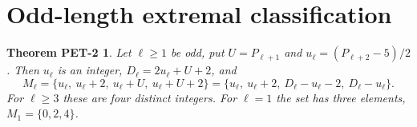 \documentclass[11pt]{amsart}
\theoremstyle{definition}
\theoremstyle{remark}
\theoremstyle{plain}
\newtheorem*{thmPETtwo}{Theorem PET-2}
\numberwithin{equation}{section}
\begin{document}
\section{Odd-length extremal classification}\label{sec:pet2}

\begin{thmPETtwo}\label{thm:pet2}
Let $\ell\ge1$ be odd, put $U=P_{\ell+1}$ and $u_\ell=(P_{\ell+2}-5)/2$. Then $u_\ell$ is an
integer, $D_\ell=2u_\ell+U+2$, and
\[
M_\ell=\{u_\ell,\ u_\ell+2,\ u_\ell+U,\ u_\ell+U+2\}
=\{u_\ell,\ u_\ell+2,\ D_\ell-u_\ell-2,\ D_\ell-u_\ell\}.
\]
For $\ell\ge3$ these are four distinct integers. For $\ell=1$ the set has three elements,
$M_1=\{0,2,4\}$.
\end{thmPETtwo}
\end{document}
